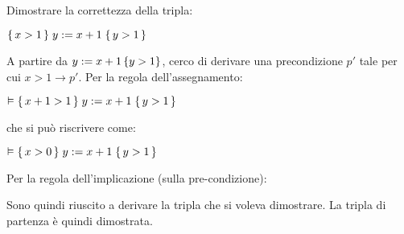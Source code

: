 \begin{exmp}
    Dimostrare la correttezza della tripla:
    \begin{center}
        $\Hoaretriple{x>1}{y:=x+1}{y>1}$
    \end{center}
    A partire da $y:=x+1 \cbra{y>1}$, cerco di derivare una precondizione $p'$ tale per cui $x>1 \rightarrow p'$.
    Per la regola dell'assegnamento:
    \begin{center}
        $\vDash \Hoaretriple{x+1>1}{y:=x+1}{y>1}$
    \end{center}
    che si può riscrivere come:
    \begin{center}
        $\vDash \Hoaretriple{x>0}{y:=x+1}{y>1}$
    \end{center}
    Per la regola dell'implicazione (sulla pre-condizione):
    \begin{center}
        \begin{prooftree}
        \end{prooftree}
    \end{center}
    Sono quindi riuscito a derivare la tripla che si voleva dimostrare.
    La tripla di partenza è quindi dimostrata.
\end{exmp}


